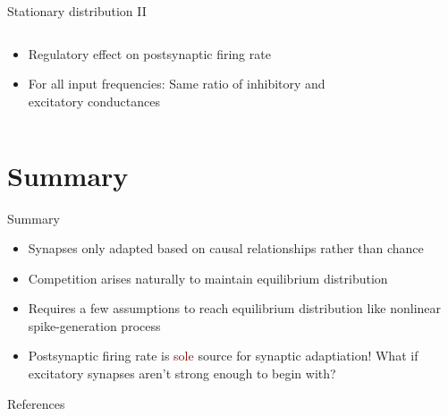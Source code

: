 \documentclass[aspectratio=169]{beamer}
\begin{document}
\begin{frame}{Stationary distribution II}
	\begin{columns}
		\begin{column}{0.5\textwidth}
			\begin{itemize}
				\item<1-> Regulatory effect on postsynaptic firing rate\\
				
				\item<2-> For all input frequencies: Same ratio of inhibitory and excitatory conductances
				
			\end{itemize}
			
		\end{column}
		\begin{column}{0.5\textwidth}
			\begin{figure}
				
				\centering
			\end{figure}
		\end{column}
	\end{columns}
\end{frame}
\section{Summary}
\begin{frame}{Summary}
\begin{itemize}
	\item<2-> Synapses only adapted based on causal relationships rather than chance 
	\item<3-> Competition arises naturally to maintain equilibrium distribution
\end{itemize}
\begin{itemize}
	\item<5-> Requires a few assumptions to reach equilibrium distribution like nonlinear spike-generation process
	\item<6-> Postsynaptic firing rate is \textcolor{darkred}{sole} source for synaptic adaptiation! What if excitatory synapses aren't strong enough to begin with?
\end{itemize}
\end{frame}

\begin{frame}{References}

\end{frame}
\end{document}
